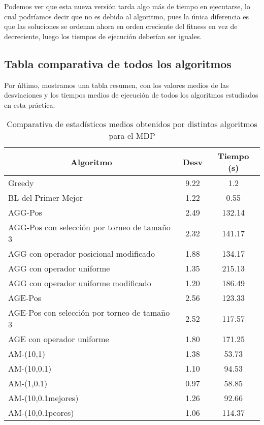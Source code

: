 \documentclass[10pt,a4paper]{article}
\begin{document}
Podemos ver que esta nueva versión tarda algo más de tiempo en ejecutarse, lo cual podríamos decir que no es debido al algoritmo, pues la única diferencia es que las soluciones se ordenan ahora en orden creciente del fitness en vez de decreciente, luego los tiempos de ejecución deberían ser iguales. 

\subsection{Tabla comparativa de todos los algoritmos}

Por último, mostramos una tabla resumen, con los valores medios de las desviaciones y los tiempos medios de ejecución de todos los algoritmos estudiados en esta práctica: 

\begin{table}[H]
	\begin{center}
		\begin{tabular}{|l|c|c|}
			\hline
			\multicolumn{1}{|c|}{\textbf{Algoritmo}} & \textbf{Desv} & \textbf{Tiempo (s)} \\ \hline
			Greedy & 9.22 & 1.2 \\ \hline
			BL del Primer Mejor & 1.22 & 0.55 \\ \hline
			AGG-Pos & 2.49 & 132.14 \\ \hline
			AGG-Pos con selección por torneo de tamaño 3 & 2.32 & 141.17 \\ \hline
			AGG con operador posicional modificado & 1.88 & 134.17 \\ \hline
			AGG con operador uniforme & 1.35 & 215.13 \\ \hline
			AGG con operador uniforme modificado & 1.20 & 186.49 \\ \hline
			AGE-Pos & 2.56 & 123.33 \\ \hline
			AGE-Pos con selección por torneo de tamaño 3 & 2.52 & 117.57 \\ \hline
			AGE con operador uniforme & 1.80 & 171.25 \\ \hline
			AM-(10,1) & 1.38 & 53.73 \\ \hline
			AM-(10,0.1) & 1.10 & 94.53 \\ \hline
			AM-(1,0.1) & 0.97 & 58.85 \\ \hline
			AM-(10,0.1mejores) & 1.26 & 92.66 \\ \hline
			AM-(10,0.1peores) & 1.06 & 114.37 \\ \hline
		\end{tabular}
	\end{center}
	\caption{Comparativa de estadísticos medios obtenidos por distintos algoritmos para el MDP}
	\label{}
\end{table}
\end{document}
